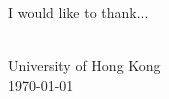 \begin{acknowledgements}
\setcounter{page}{2}
\addchaptertocentry{\acknowledgementname} %
\vspace{1cm}


\noindent I would like to thank...
\\[0.4cm]

\begin{flushright}
    \authorname \\
    University of Hong Kong \\
    \usdate\today
\end{flushright}

\end{acknowledgements}